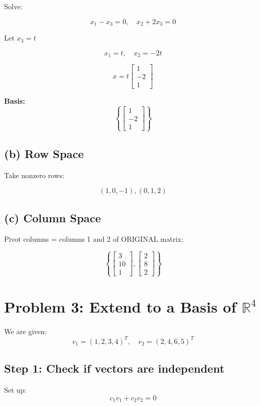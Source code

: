 \documentclass[11pt]{article}
\begin{document}
Solve:

\[
x_1 - x_3 = 0,\quad x_2 + 2x_3 = 0
\]

Let $x_3 = t$

\[
x_1 = t,\quad x_2 = -2t
\]

\[
x =
t
\begin{bmatrix}
1\\-2\\1
\end{bmatrix}
\]

\textbf{Basis:}
\[
\left\{
\begin{bmatrix}
1\\-2\\1
\end{bmatrix}
\right\}
\]

\subsection*{(b) Row Space}

Take nonzero rows:

\[
(1,0,-1), (0,1,2)
\]

\subsection*{(c) Column Space}

Pivot columns = columns 1 and 2 of ORIGINAL matrix:

\[
\left\{
\begin{bmatrix}3\\10\\1\end{bmatrix},
\begin{bmatrix}2\\8\\2\end{bmatrix}
\right\}
\]


\section*{Problem 3: Extend to a Basis of $\mathbb{R}^4$}

We are given:
\[
v_1 = (1,2,3,4)^T,\quad v_2 = (2,4,6,5)^T
\]

\subsection*{Step 1: Check if vectors are independent}

Set up:
\[
c_1 v_1 + c_2 v_2 = 0
\]
\end{document}
